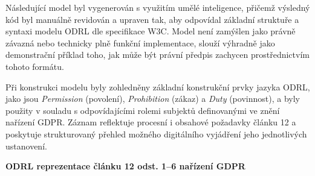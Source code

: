 Následující model byl vygenerován s využitím umělé inteligence, přičemž výsledný kód byl manuálně revidován a upraven tak, aby odpovídal základní struktuře a syntaxi modelu ODRL dle specifikace W3C. Model není zamýšlen jako právně závazná nebo technicky plně funkční implementace, slouží výhradně jako demonstrační příklad toho, jak může být právní předpis zachycen prostřednictvím tohoto formátu.

Při konstrukci modelu byly zohledněny základní konstrukční prvky jazyka ODRL, jako jsou \textit{Permission} (povolení), \textit{Prohibition} (zákaz) a \textit{Duty} (povinnost), a byly použity v souladu s odpovídajícími rolemi subjektů definovanými ve znění nařízení GDPR. Záznam reflektuje procesní i obsahové požadavky článku 12 a poskytuje strukturovaný přehled možného digitálního vyjádření jeho jednotlivých ustanovení.
\vspace{1em}

\noindent \textbf{ODRL reprezentace článku 12 odst. 1–6 nařízení GDPR}

